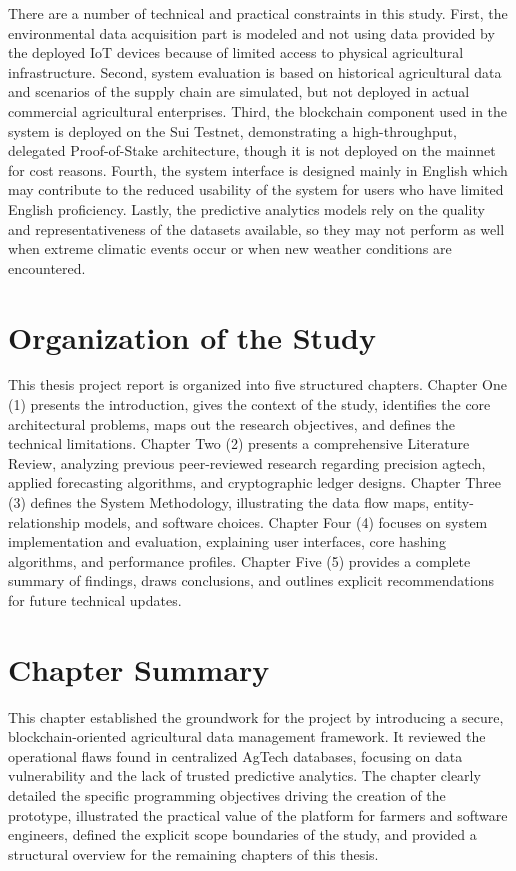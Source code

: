 There are a number of technical and practical constraints in this study. First, the environmental data acquisition part is modeled and not using data provided by the deployed IoT devices because of limited access to physical agricultural infrastructure. Second, system evaluation is based on historical agricultural data and scenarios of the supply chain are simulated, but not deployed in actual commercial agricultural enterprises. Third, the blockchain component used in the system is deployed on the Sui Testnet, demonstrating a high-throughput, delegated Proof-of-Stake architecture, though it is not deployed on the mainnet for cost reasons. Fourth, the system interface is designed mainly in English which may contribute to the reduced usability of the system for users who have limited English proficiency.
Lastly, the predictive analytics models rely on the quality and representativeness of the datasets available, so they may not perform as well when extreme climatic events occur or when new weather conditions are encountered.

\section{Organization of the Study}

This thesis project report is organized into five structured chapters. Chapter One (1) presents the introduction, gives the context of the study, identifies the core architectural problems, maps out the research objectives, and defines the technical limitations. Chapter Two (2) presents a comprehensive Literature Review, analyzing previous peer-reviewed research regarding precision agtech, applied forecasting algorithms, and cryptographic ledger designs. Chapter Three (3) defines the System Methodology, illustrating the data flow maps, entity-relationship models, and software choices. Chapter Four (4) focuses on system implementation and evaluation, explaining user interfaces, core hashing algorithms, and performance profiles. Chapter Five (5) provides a complete summary of findings, draws conclusions, and outlines explicit recommendations for future technical updates.

\section{Chapter Summary}

This chapter established the groundwork for the project by introducing a secure, blockchain-oriented agricultural data management framework. It reviewed the operational flaws found in centralized AgTech databases, focusing on data vulnerability and the lack of trusted predictive analytics. The chapter clearly detailed the specific programming objectives driving the creation of the prototype, illustrated the practical value of the platform for farmers and software engineers, defined the explicit scope boundaries of the study, and provided a structural overview for the remaining chapters of this thesis.
